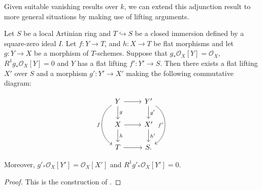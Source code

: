\documentclass[a4paper,12pt]{book}
\newcommand{\ox}{\mathcal{O}_{X}}
\begin{document}
	Given suitable vanishing results over $k$, we can extend this adjunction result to more general situations by making use of lifting arguments.
	
	\begin{proposition}\label{push-lift}
		Let $S$ be a local Artinian ring and $T \hookrightarrow S$ be a closed immersion defined by a square-zero ideal $I$.  Let $f\colon Y \to T$, and $h\colon X \to T$ be flat morphisms and let $g\colon Y \to X$ be a morphism of $T$-schemes. 
		Suppose that $g_{*} \ox[Y]=\ox$, $R^{1}g_{*} \ox[Y] = 0$ and $Y$ has a flat lifting $f' \colon Y' \to S$. Then there exists a flat lifting $X'$ over $S$ and a morphism $g' \colon Y' \to X'$ making the following commutative diagram:
		
		\[\begin{tikzcd}
			Y \arrow[r] \arrow[d, "g"]  \arrow[bend right=60,swap, "f"]{dd}
			& Y' \arrow[d, "g'"] \arrow[bend left=60,swap, "f'"]{dd} \\
			X \arrow[d, "h"] \arrow[r] & X' \arrow[d, "h'"] \\
			T \arrow[r]                        & S    .                     
		\end{tikzcd}\]
		
		Moreover,  $g'_{*} \ox[Y']=\ox[X']$ and $R^{1}g'_{*} \ox[Y'] = 0$.
	\end{proposition}
	
	\begin{proof}
		This is the construction of \cite[Theorem 3.1]{cynk2009small}.\end{proof} %
		
		
\end{document}
